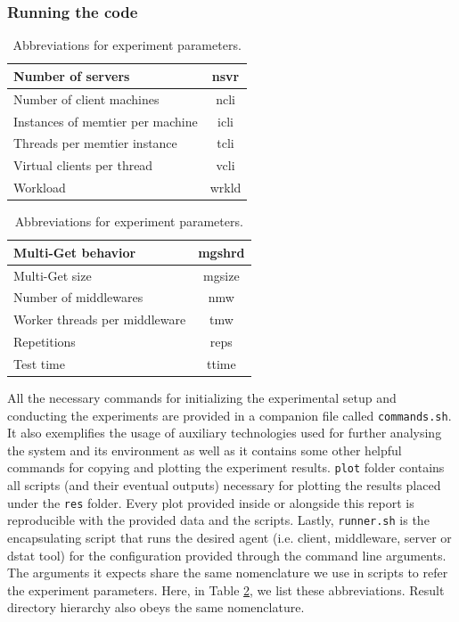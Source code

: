 \documentclass[11pt,a4paper]{article}
\begin{document}
\subsubsection*{Running the code} \label{sec:app-running-the-code}
\begin{table}[h]
\begin{minipage}{.5\textwidth}
	\centering
	\begin{tabular}{|l|c|}
		\hline Number of servers                & nsvr	\\
		\hline Number of client machines        & ncli	\\
		\hline Instances of memtier per machine & icli	\\
		\hline Threads per memtier instance     & tcli	\\
		\hline Virtual clients per thread       & vcli	\\
		\hline Workload                         & wrkld	\\
		\hline 
	\end{tabular}
\end{minipage}%
\begin{minipage}{.5\textwidth}
	\centering
	\begin{tabular}{|l|c|}
		\hline Multi-Get behavior               & mgshrd	\\
		\hline Multi-Get size                   & mgsize	\\
		\hline Number of middlewares            & nmw		\\
		\hline Worker threads per middleware    & tmw		\\
		\hline Repetitions                      & reps	\\
		\hline Test time                        & ttime	\\
		\hline 
	\end{tabular}
\end{minipage}
\caption{Abbreviations for experiment parameters.} \label{tab:param-abbrs}
\end{table}	
All the necessary commands for initializing the experimental setup and conducting the experiments are provided in a companion file called \texttt{commands.sh}. It also exemplifies the usage of auxiliary technologies used for further analysing the system and its environment as well as it contains some other helpful commands for copying and plotting the experiment results. \texttt{plot} folder contains all scripts (and their eventual outputs) necessary for plotting the results placed under the \texttt{res} folder. Every plot provided inside or alongside this report is reproducible with the provided data and the scripts. Lastly, \texttt{runner.sh} is the encapsulating script that runs the desired agent (i.e. client, middleware, server or dstat tool) for the configuration provided through the command line arguments. The arguments it expects share the same nomenclature we use	in scripts to refer the experiment parameters. Here, in Table \ref{tab:param-abbrs}, we list these abbreviations. Result directory hierarchy also obeys the same nomenclature.
\end{document}

